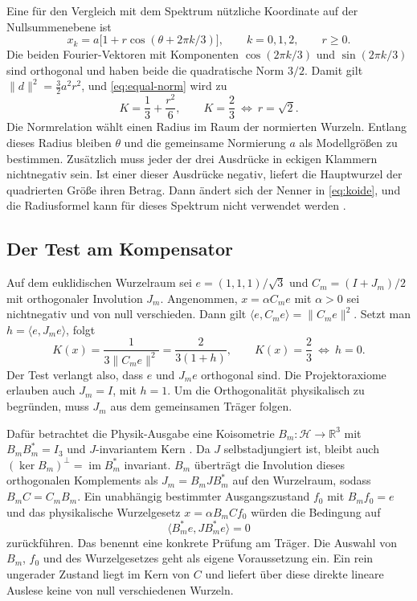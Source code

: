 Eine für den Vergleich mit dem Spektrum nützliche Koordinate auf der
Nullsummenebene ist
\begin{equation}
 x_k=a\bigl[1+r\cos(\theta+2\pi k/3)\bigr],
 \qquad k=0,1,2,\qquad r\geq0 .
 \label{eq:koide-radius-phase}
\end{equation}
Die beiden Fourier-Vektoren mit Komponenten \(\cos(2\pi k/3)\)
und \(\sin(2\pi k/3)\) sind orthogonal und haben beide die
quadratische Norm \(3/2\). Damit gilt
\(\|d\|^2=\tfrac32a^2r^2\), und \eqref{eq:equal-norm} wird zu
\[
 K=\frac13+\frac{r^2}{6},\qquad K=\frac23\ \Longleftrightarrow\ r=\sqrt2 .
\]
Die Normrelation wählt einen Radius im Raum der normierten Wurzeln.
Entlang dieses Radius bleiben \(\theta\) und die gemeinsame
Normierung \(a\) als Modellgrößen zu bestimmen. Zusätzlich muss jeder
der drei Ausdrücke in eckigen Klammern nichtnegativ sein. Ist einer dieser Ausdrücke
negativ, liefert die Hauptwurzel der quadrierten Größe ihren
Betrag. Dann ändert sich der Nenner in \eqref{eq:koide}, und die
Radiusformel kann für dieses Spektrum nicht verwendet werden
\cite{companion,physics}.

\subsection{Der Test am Kompensator}

Auf dem euklidischen Wurzelraum sei \(e=(1,1,1)/\sqrt3\) und \(C_m=(I+J_m)/2\) mit orthogonaler Involution \(J_m\). Angenommen, \(x=\alpha C_m e\) mit \(\alpha>0\) sei nichtnegativ und von null verschieden. Dann gilt \(\langle e,C_m e\rangle=\|C_m e\|^2\). Setzt man \(h=\langle e,J_m e\rangle\), folgt
\begin{equation}
 K(x)=\frac{1}{3\|C_m e\|^2}
      =\frac{2}{3(1+h)},\qquad
 K(x)=\frac23\ \Longleftrightarrow\ h=0.
 \label{eq:hc-criterion}
\end{equation}
Der Test verlangt also, dass \(e\) und \(J_me\) orthogonal sind. Die Projektoraxiome erlauben auch \(J_m=I\), mit \(h=1\). Um die Orthogonalität physikalisch zu begründen, muss \(J_m\) aus dem gemeinsamen Träger folgen.

Dafür betrachtet die Physik-Ausgabe eine Koisometrie \(B_m:\mathcal H\to\mathbb R^3\) mit \(B_mB_m^*=I_3\) und \(J\)-invariantem Kern \cite{physics}. Da \(J\) selbstadjungiert ist, bleibt auch \((\ker B_m)^\perp=\operatorname{im} B_m^*\) invariant. \(B_m\) überträgt die Involution dieses orthogonalen Komplements als \(J_m=B_mJB_m^*\) auf den Wurzelraum, sodass \(B_mC=C_mB_m\). Ein unabhängig bestimmter Ausgangszustand \(f_0\) mit \(B_mf_0=e\) und das physikalische Wurzelgesetz \(x=\alpha B_mCf_0\) würden die Bedingung auf
\[
 \langle B_m^*e,J B_m^*e\rangle=0
\]
zurückführen. Das benennt eine konkrete Prüfung am Träger. Die Auswahl von \(B_m\), \(f_0\) und des Wurzelgesetzes geht als eigene Voraussetzung ein. Ein rein ungerader Zustand liegt im Kern von \(C\) und liefert über diese direkte lineare Auslese keine von null verschiedenen Wurzeln.

